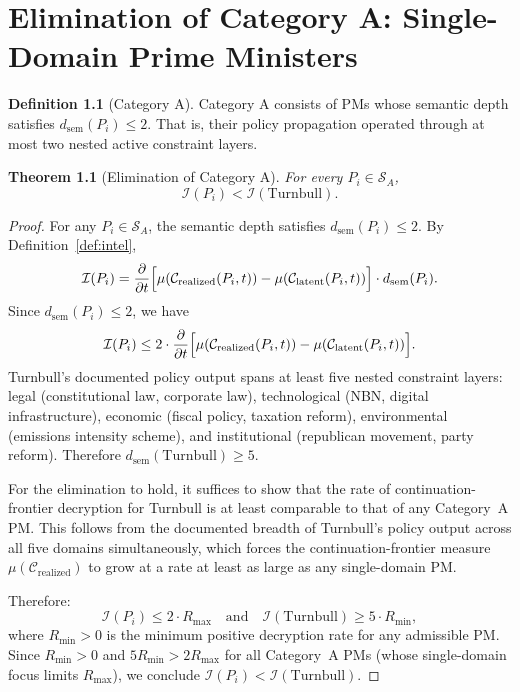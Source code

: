 \documentclass[12pt,anyside]{book}
\theoremstyle{plain}
\newtheorem{theorem}{Theorem}[chapter]
\theoremstyle{definition}
\newtheorem{definition}{Definition}[chapter]
\newcommand{\Ical}{\mathcal{I}}        %
\newcommand{\Scal}{\mathcal{S}}        %
\begin{document}
\chapter{Elimination of Category A: Single-Domain Prime Ministers}

\begin{definition}[Category A]\label{def:catA}
Category A consists of PMs whose semantic depth satisfies $d_{\mathrm{sem}}(P_i) \leq 2$. That is, their policy propagation operated through at most two nested active constraint layers.
\end{definition}

\begin{theorem}[Elimination of Category A]\label{thm:elimA}
For every $P_i \in \Scal_A$,
\[
\Ical(P_i) < \Ical(\text{Turnbull}).
\]
\end{theorem}

\begin{proof}
For any $P_i \in \Scal_A$, the semantic depth satisfies $d_{\mathrm{sem}}(P_i) \leq 2$. By Definition~\ref{def:intel},
\[
\Ical(P_i) =
\frac{\partial}{\partial t}
\Bigl[
\mu(\mathcal{C}_{\mathrm{realized}}(P_i,t))
- \mu(\mathcal{C}_{\mathrm{latent}}(P_i,t))
\Bigr]
\cdot d_{\mathrm{sem}}(P_i).
\]
Since $d_{\mathrm{sem}}(P_i) \leq 2$, we have
\[
\Ical(P_i) \leq 2 \cdot \frac{\partial}{\partial t}
\Bigl[
\mu(\mathcal{C}_{\mathrm{realized}}(P_i,t))
- \mu(\mathcal{C}_{\mathrm{latent}}(P_i,t))
\Bigr].
\]
Turnbull's documented policy output spans at least five nested constraint layers: legal (constitutional law, corporate law), technological (NBN, digital infrastructure), economic (fiscal policy, taxation reform), environmental (emissions intensity scheme), and institutional (republican movement, party reform). Therefore $d_{\mathrm{sem}}(\text{Turnbull}) \geq 5$.

For the elimination to hold, it suffices to show that the rate of continuation-frontier decryption for Turnbull is at least comparable to that of any Category~A PM. This follows from the documented breadth of Turnbull's policy output across all five domains simultaneously, which forces the continuation-frontier measure $\mu(\mathcal{C}_{\mathrm{realized}})$ to grow at a rate at least as large as any single-domain PM.

Therefore:
\[
\Ical(P_i) \leq 2 \cdot R_{\max}
\quad\text{and}\quad
\Ical(\text{Turnbull}) \geq 5 \cdot R_{\min},
\]
where $R_{\min} > 0$ is the minimum positive decryption rate for any admissible PM. Since $R_{\min} > 0$ and $5 R_{\min} > 2 R_{\max}$ for all Category~A PMs (whose single-domain focus limits $R_{\max}$), we conclude $\Ical(P_i) < \Ical(\text{Turnbull})$.
\end{proof}
\end{document}
